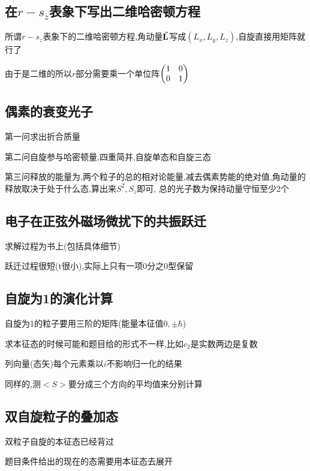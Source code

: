 \documentclass{article}
\begin{document}
        \subsection{在\texorpdfstring{$r-s_{z}$}{}表象下写出二维哈密顿方程}
            所谓$r-s_{z}$表象下的二维哈密顿方程,角动量$\va{L}$写成$(L_{x},L_{y},L_{z})$,自旋直接用矩阵就行了

            由于是二维的所以$r$部分需要乘一个单位阵$\mqty(1 & 0 \\ 0 & 1)$

        \subsection{偶素的衰变光子}
            第一问求出折合质量

            第二问自旋参与哈密顿量,四重简并,自旋单态和自旋三态

            第三问释放的能量为,两个粒子的总的相对论能量,减去偶素势能的绝对值,角动量的释放取决于处于什么态,算出来$S^{2},S_{z}$即可,
            总的光子数为保持动量守恒至少2个

        \subsection{电子在正弦外磁场微扰下的共振跃迁}
            求解过程为书上(包括具体细节)
            
            跃迁过程很短(t很小),实际上只有一项0分之0型保留

        \subsection{自旋为1的演化计算}
            自旋为1的粒子要用三阶的矩阵(能量本征值$ 0,\pm \hbar $)

            求本征态的时候可能和题目给的形式不一样,比如$c_{2}$是实数两边是复数
            \begin{formal}
                列向量(态矢)每个元素乘以$i$不影响归一化的结果
            \end{formal}

            同样的,测$<S>$要分成三个方向的平均值来分别计算


        \subsection{双自旋粒子的叠加态}
            双粒子自旋的本征态已经背过

            题目条件给出的现在的态需要用本征态去展开
\end{document}

